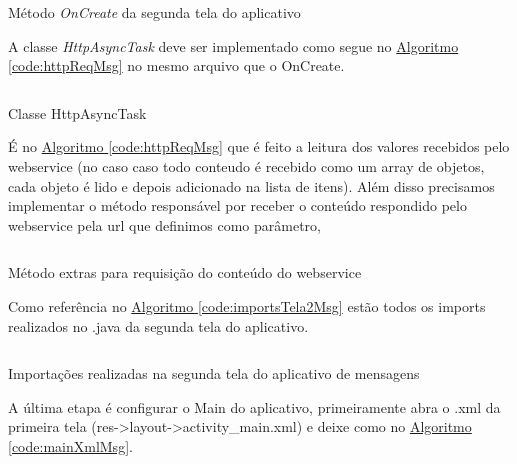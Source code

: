 \documentclass[a4paper,12pt,brazil,oneside]{book}
\begin{document}
\begin{listing}[H]
	\inputminted[linenos=true,fontsize=\small,frame=lines, framesep=2mm, tabsize=2,numbersep=5pt]{xml}{src/devapp/muraldemensagens/msgOnCreate.java}
	\caption{Método \emph{OnCreate} da segunda tela do aplicativo}
	\label{code:OnCreateMSG2}
	\end{listing}
	
A classe \emph{HttpAsyncTask} deve ser implementado como segue no \hyperref[code:httpReqMsg]{Algoritmo \ref*{code:httpReqMsg}} no mesmo arquivo que o OnCreate.

\begin{listing}[H]
	\inputminted[linenos=true,fontsize=\small,frame=lines, framesep=2mm, tabsize=2,numbersep=5pt]{xml}{src/devapp/muraldemensagens/HttpReq.java}
	\caption{Classe HttpAsyncTask }
	\label{code:httpReqMsg}
	\end{listing}
	
É no \hyperref[code:httpReqMsg]{Algoritmo \ref*{code:httpReqMsg}}  que é feito a leitura dos valores recebidos pelo webservice (no caso caso todo conteudo é recebido como um array de objetos, cada objeto é lido e depois adicionado na lista de itens). Além disso precisamos implementar o método responsável por receber o conteúdo respondido pelo webservice pela url que definimos como parâmetro,

\begin{listing}[H]
	\inputminted[linenos=true,fontsize=\small,frame=lines, framesep=2mm, tabsize=2,numbersep=5pt]{xml}{src/devapp/muraldemensagens/extraMsg.java}
	\caption{Método extras para requisição do conteúdo do webservice}
	\label{code:metodosExtras}
	\end{listing}
	
Como referência no \hyperref[code:importsTela2Msg]{Algoritmo \ref*{code:importsTela2Msg}} estão todos os imports realizados no .java da segunda tela do aplicativo.

\begin{listing}[H]
	\inputminted[linenos=true,fontsize=\small,frame=lines, framesep=2mm, tabsize=2,numbersep=5pt]{xml}{src/devapp/muraldemensagens/importsMsg.java}
	\caption{Importações realizadas na segunda tela do aplicativo de mensagens }
	\label{code:importsTela2Msg}
	\end{listing}

A última etapa é configurar o Main do aplicativo, primeiramente abra o .xml da primeira tela (res->layout->activity\_main.xml) e deixe como no \hyperref[code:mainXmlMsg]{Algoritmo \ref*{code:mainXmlMsg}}.
\end{document}
